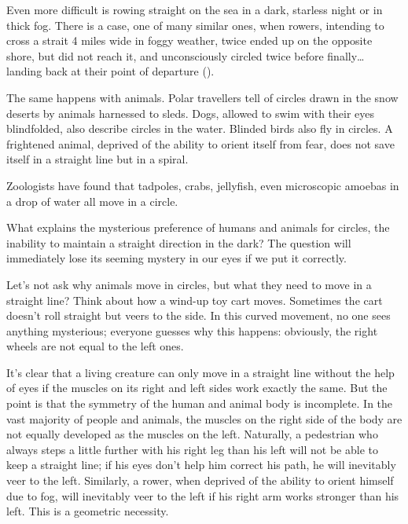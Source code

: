 Even more difficult is rowing straight on the sea in a dark, starless night or in thick fog. There is a case, one of many similar ones, when rowers, intending to cross a strait 4 miles wide in foggy weather, twice ended up on the opposite shore, but did not reach it, and unconsciously circled twice before finally\dots{} landing back at their point of departure ().

The same happens with animals. Polar travellers tell of circles drawn in the snow deserts by animals harnessed to sleds. Dogs, allowed to swim with their eyes blindfolded, also describe circles in the water. Blinded birds also fly in circles. A frightened animal, deprived of the ability to orient itself from fear, does not save itself in a straight line but in a spiral.

Zoologists have found that tadpoles, crabs, jellyfish, even microscopic amoebas in a drop of water all move in a circle.

What explains the mysterious preference of humans and animals for circles, the inability to maintain a straight direction in the dark? The question will immediately lose its seeming mystery in our eyes if we put it correctly.

Let's not ask why animals move in circles, but what they need to move in a straight line? Think about how a wind-up toy cart moves. Sometimes the cart doesn't roll straight but veers to the side. In this curved movement, no one sees anything mysterious; everyone guesses why this happens: obviously, the right wheels are not equal to the left ones.

It's clear that a living creature can only move in a straight line without the help of eyes if the muscles on its right and left sides work exactly the same. But the point is that the symmetry of the human and animal body is incomplete. In the vast majority of people and animals, the muscles on the right side of the body are not equally developed as the muscles on the left. Naturally, a pedestrian who always steps a little further with his right leg than his left will not be able to keep a straight line; if his eyes don't help him correct his path, he will inevitably veer to the left. Similarly, a rower, when deprived of the ability to orient himself due to fog, will inevitably veer to the left if his right arm works stronger than his left. This is a geometric necessity.

